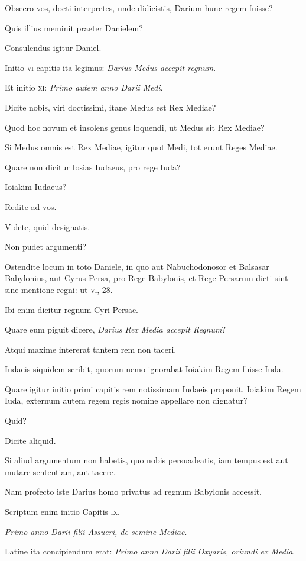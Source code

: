 \begin{parnumbers}
Obsecro
vos, docti interpretes, unde didicistis, Darium hunc regem fuisse?

Quis illius meminit praeter Danielem?

Consulendus igitur Daniel.

Initio \textsc{vi} capitis ita legimus:
 \textit{Darius Medus accepit regnum}.

Et initio \textsc{xi}: \textit{Primo autem anno Darii Medi}.

Dicite nobis, viri doctissimi, itane
Medus est Rex Mediae?

Quod hoc novum et insolens genus loquendi,
ut Medus sit Rex Mediae?

Si Medus omnis est Rex Mediae,
igitur quot Medi, tot erunt Reges Mediae.

Quare non dicitur Iosias
Iudaeus, pro rege Iuda?

Ioiakim Iudaeus?

Redite ad vos.

Videte, quid
designatis.

Non pudet argumenti?

Ostendite locum in toto Daniele,
in quo aut Nabuchodonosor et Balsasar Babylonius, aut Cyrus
Persa, pro Rege Babylonis, et Rege Persarum dicti sint sine mentione
regni: ut \textsc{vi}, 28.

Ibi enim dicitur regnum Cyri Persae.

Quare eum piguit dicere, \textit{Darius Rex Media accepit Regnum}?

Atqui maxime intererat
tantem rem non taceri.

Iudaeis siquidem scribit, quorum nemo
ignorabat Ioiakim Regem fuisse Iuda.

Quare igitur initio primi
capitis rem notissimam Iudaeis proponit, Ioiakim Regem Iuda, externum
autem regem regis nomine appellare non dignatur?

Quid?

Dicite aliquid.

Si aliud argumentum non habetis, quo nobis persuadeatis,
iam tempus est aut mutare sententiam, aut tacere.

Nam profecto iste Darius homo privatus ad regnum Babylonis accessit.

Scriptum
enim initio Capitis \textsc{ix}.

\textit{Primo anno Darii filii Assueri, de semine
Mediae}.

Latine ita concipiendum erat: \textit{Primo anno Darii filii Oxyaris,
oriundi ex Media}.


\end{parnumbers}
